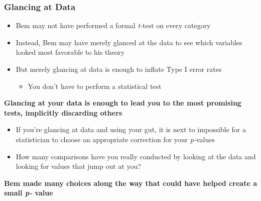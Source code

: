 \documentclass[10pt, block=fill]{beamer}
\begin{document}
\begin{frame}
    \frametitle{Glancing at Data}
    
    \begin{itemize}
        \item Bem may not have performed a formal \textit{t-}test on every category
        \item Instead, Bem may have merely glanced at the data to see which variables looked most favorable to his theory
        \item But merely glancing at data is enough to inflate Type I error rates
        \begin{itemize}
            \item You don't have to perform a statistical test
        \end{itemize}
    \end{itemize}
    
    \textbf{Glancing at your data is enough to lead you to the most promising tests, implicitly discarding others}
    \begin{itemize}
        \item If you're glancing at data and using your gut, it is next to impossible for a statistician to choose an appropriate correction for your \textit{p-}values
        \item How many comparisons have you really conducted by looking at the data and looking for values that jump out at you?
    \end{itemize}
    
    \textbf{ {\large Bem made many choices along the way that could have helped create a small \textit{p-} value}}
\end{frame}
\end{document}
